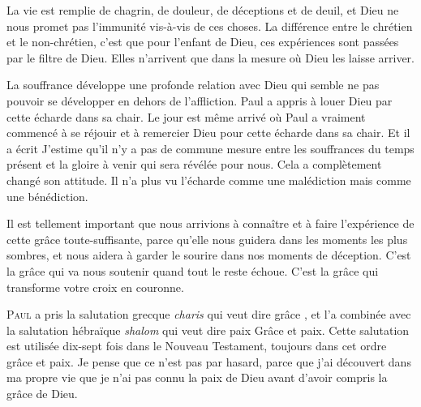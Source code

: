 La vie est remplie de chagrin, de douleur, de déceptions et de deuil,
 et Dieu ne nous promet pas l'immunité vis-à-vis de ces choses.
 La différence entre le chrétien et le non-chrétien,
 c'est que pour l'enfant de Dieu, ces expériences sont passées
 par le filtre de Dieu. Elles n'arrivent que dans la mesure
 où Dieu les laisse arriver.


La souffrance développe une profonde relation avec Dieu qui semble
 ne pas pouvoir se développer en dehors de l'affliction.
 Paul a appris à louer Dieu par cette écharde dans sa chair.
 Le jour est même arrivé où Paul a vraiment commencé à se réjouir
 et à remercier Dieu pour cette écharde dans sa chair.
 Et il a écrit\frcolon{} 
 \Og J'estime qu'il n'y a pas de commune mesure entre les souffrances
 du temps présent et la gloire à venir qui sera révélée pour nous. \Fg{}
 Cela a complètement changé son attitude. Il n'a plus vu l'écharde
 comme une malédiction mais comme une bénédiction.

Il est tellement important que nous arrivions à connaître
 et à faire l'expérience de cette grâce toute-suffisante,
 parce qu'elle nous guidera dans les moments les plus sombres,
 et nous aidera à garder le sourire dans nos moments de déception.
 C'est la grâce qui va nous soutenir quand tout le reste échoue.
 C'est la grâce qui transforme votre croix en couronne.

\dvrule






\lettrine{P}{aul} a pris la salutation grecque \emph{charis}
 qui veut dire \Og grâce \Fg{}, et l'a combinée avec la salutation
 hébraïque \emph{shalom} qui veut dire \Og paix \Fg{}\frcolon{} 
 \Og Grâce et paix. \Fg{}
 Cette salutation est utilisée dix-sept fois dans le Nouveau Testament,
 toujours dans cet ordre\frcolon{}  \Og grâce et paix. \Fg{}
 Je pense que ce n'est pas par hasard, parce que j'ai découvert
 dans ma propre vie que je n'ai pas connu la paix de Dieu
 avant d'avoir compris la grâce de Dieu.

